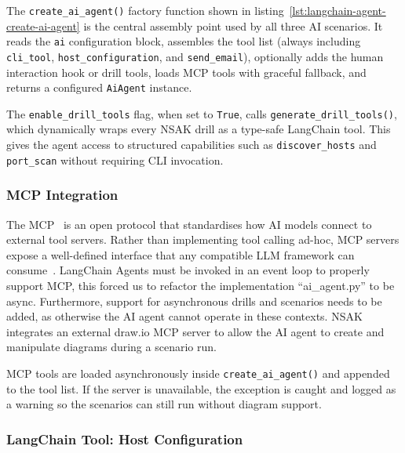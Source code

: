 The \texttt{create_ai_agent()} factory function shown in listing~\ref{lst:langchain-agent-create-ai-agent} is the central assembly point used by all three \gls{AI} scenarios.
It reads the \texttt{ai} configuration block, assembles the tool list (always including \texttt{cli_tool},
\texttt{host_configuration}, and \texttt{send_email}), optionally adds the human interaction hook or drill tools,
loads \gls{MCP} tools with graceful fallback, and returns a configured \texttt{AiAgent} instance.

The \texttt{enable_drill_tools} flag, when set to \texttt{True}, calls \texttt{generate_drill_tools()}, which dynamically wraps every \gls{NSAK} drill as a type-safe LangChain tool.
This gives the agent access to structured capabilities such as \texttt{discover_hosts} and \texttt{port_scan} without requiring \gls{CLI} invocation.

\subsubsection{MCP Integration}\label{subsubsec:ai-agent-mcp-integration}

The \gls{MCP}~\cite{anthropic-mcp} is an open protocol that standardises how \gls{AI} models connect to external tool servers.
Rather than implementing tool calling ad-hoc, \gls{MCP} servers expose a well-defined interface that any compatible \gls{LLM} framework can consume~\cite{mcp-landscape}.
LangChain Agents must be invoked in an event loop to properly support \gls{MCP}, this forced us to refactor the implementation \enquote{ai\_agent.py} to be async.
Furthermore, support for asynchronous drills and scenarios needs to be added, as otherwise the \gls{AI} agent cannot operate in these contexts.
\gls{NSAK} integrates an external draw.io \gls{MCP} server to allow the \gls{AI} agent to create and manipulate diagrams during a scenario run.

\gls{MCP} tools are loaded asynchronously inside \texttt{create_ai_agent()} and appended to the tool list.
If the server is unavailable, the exception is caught and logged as a warning so the scenarios can still run without diagram support.

\subsubsection{LangChain Tool: Host Configuration}\label{subsubsec:langchain-tool-host-configuration}

